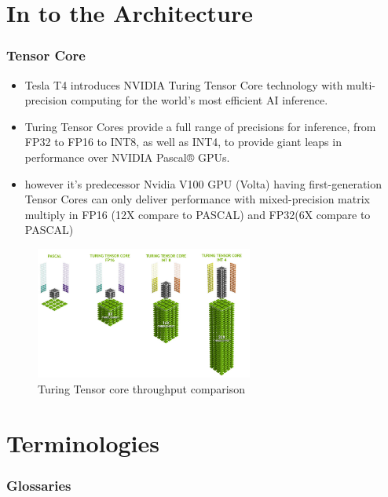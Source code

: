 \documentclass[xcolor=x11names,table]{beamer}
\begin{document}
\section{In to the Architecture}
    \begin{frame}[allowframebreaks]
    \frametitle{Tensor Core}
        \begin{itemize}
            \item Tesla T4 introduces NVIDIA Turing Tensor Core technology with multi-precision computing for the world’s most efficient AI inference. 
            
            \item Turing Tensor Cores provide a full range of precisions for inference, from FP32 to FP16 to INT8, as well as INT4, to provide giant leaps in performance over NVIDIA Pascal® GPUs.
            
            \item however it's predecessor Nvidia V100 GPU (Volta) having first-generation Tensor Cores can only deliver performance with mixed-precision matrix multiply in FP16 (12X compare to PASCAL) and FP32(6X compare to PASCAL)
        \end{itemize}
        \begin{figure}[H]
        \includegraphics[width=270px]{refs/turing-throughput-tensor.jpg}
        \caption{Turing Tensor core throughput comparison}
        \end{figure}
    \end{frame}

\section{Terminologies}
    \begin{frame}[allowframebreaks]
    \frametitle{Glossaries}
        \printglossaries
    \end{frame}
\end{document}
